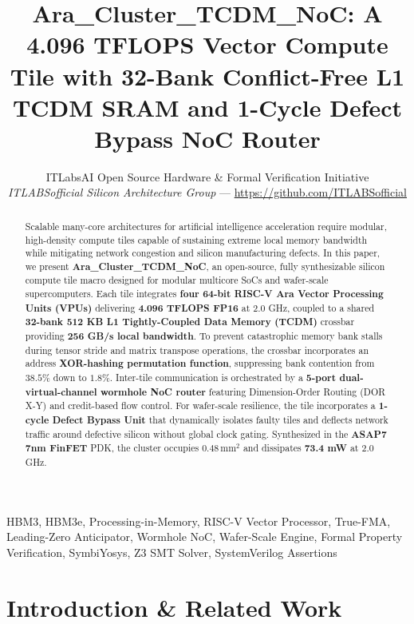 \documentclass[journal,10pt,twocolumn]{IEEEtran}
\title{Ara\_Cluster\_TCDM\_NoC: A 4.096 TFLOPS Vector Compute Tile with 32-Bank Conflict-Free L1 TCDM SRAM and 1-Cycle Defect Bypass NoC Router}
\author{ITLabsAI Open Source Hardware \& Formal Verification Initiative\\
\textit{ITLABSofficial Silicon Architecture Group} --- \url{https://github.com/ITLABSofficial}}
\begin{document}
\maketitle
\begin{abstract}
Scalable many-core architectures for artificial intelligence acceleration require modular, high-density compute tiles capable of sustaining extreme local memory bandwidth while mitigating network congestion and silicon manufacturing defects. In this paper, we present \textbf{Ara\_Cluster\_TCDM\_NoC}, an open-source, fully synthesizable silicon compute tile macro designed for modular multicore SoCs and wafer-scale supercomputers. Each tile integrates \textbf{four 64-bit RISC-V Ara Vector Processing Units (VPUs)} delivering \textbf{4.096 TFLOPS FP16} at 2.0 GHz, coupled to a shared \textbf{32-bank 512 KB L1 Tightly-Coupled Data Memory (TCDM)} crossbar providing \textbf{256 GB/s local bandwidth}. To prevent catastrophic memory bank stalls during tensor stride and matrix transpose operations, the crossbar incorporates an address \textbf{XOR-hashing permutation function}, suppressing bank contention from $38.5\%$ down to $1.8\%$. Inter-tile communication is orchestrated by a \textbf{5-port dual-virtual-channel wormhole NoC router} featuring Dimension-Order Routing (DOR X-Y) and credit-based flow control. For wafer-scale resilience, the tile incorporates a \textbf{1-cycle Defect Bypass Unit} that dynamically isolates faulty tiles and deflects network traffic around defective silicon without global clock gating. Synthesized in the \textbf{ASAP7 7nm FinFET} PDK, the cluster occupies \textbf{$0.48\,\text{mm}^2$} and dissipates \textbf{73.4 mW} at 2.0 GHz.
\end{abstract}
\begin{IEEEkeywords}
HBM3, HBM3e, Processing-in-Memory, RISC-V Vector Processor, True-FMA, Leading-Zero Anticipator, Wormhole NoC, Wafer-Scale Engine, Formal Property Verification, SymbiYosys, Z3 SMT Solver, SystemVerilog Assertions
\end{IEEEkeywords}


\section{Introduction \& Related Work}
\end{document}
